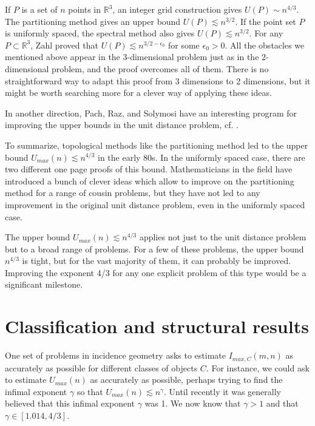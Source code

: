 \documentclass{amsart}
\newcommand{\RR}{\mathbb{R}}
\begin{document}
If $P$ is a set of $n$ points in $\RR^3$,  an integer grid construction gives $U(P) \sim n^{4/3}$.   The partitioning method gives an upper bound $U(P) \lesssim n^{3/2}$.   If the point set $P$ is uniformly spaced,  the spectral method also gives $U(P) \lesssim n^{3/2}$.    For any $P \subset \RR^3$, Zahl proved that $U(P) \lesssim n^{3/2 - \epsilon_0}$ for some $\epsilon_0 > 0$.    All the obstacles we mentioned above appear in the 3-dimensional problem just as in the 2-dimensional problem,  and the proof overcomes all of them.  There is no straightforward way to adapt this proof from 3 dimensions to 2 dimensions, but it might be worth searching more for a clever way of applying these ideas.

In another direction,  Pach,  Raz, and Solymosi have an interesting program for improving the upper bounds in the unit distance problem, cf. \cite{PRS}.  


To summarize, topological methods like the partitioning method led to the upper bound $U_{max}(n) \lesssim n^{4/3}$ in the early 80s.  In the uniformly spaced case, there are two different one page proofs of this bound.  Mathematicians in the field have introduced a bunch of clever ideas which allow to improve on the partitioning method for a range of cousin problems, but they have not led to any improvement in the original unit distance problem, even in the uniformly spaced case.  

The upper bound $U_{max}(n) \lesssim n^{4/3}$ applies not just to the unit distance problem but to a broad range of problems.  For a few of these problems, the upper bound $n^{4/3}$ is tight, but for the vast majority of them, it can probably be improved.  Improving the exponent 4/3 for any one explicit problem of this type would be a significant milestone.



\section{Classification and structural results} \label{secgoals}

One set of problems in incidence geometry asks to estimate $I_{max, C}(m,n)$ as accurately as possible for different classes of objects $C$.   For instance, we could ask to estimate $U_{max}(n)$ as accurately as possible, perhaps trying to find the infimal exponent $\gamma$ so that $U_{max}(n) \lesssim n^\gamma$.  
Until recently it was generally believed that this infimal exponent $\gamma$ was 1.  We now know that $\gamma > 1$ and that $\gamma \in [1.014, 4/3]$.  
\end{document}
